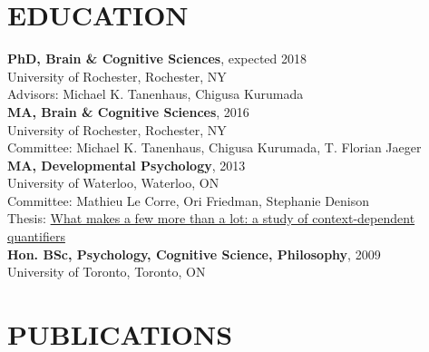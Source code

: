 \documentclass[margin, 7pt]{res} %
\begin{document}
\begin{resume} 


\section{EDUCATION}

{\bf PhD, Brain \& Cognitive Sciences}, expected 2018 \\
University of Rochester, Rochester, NY \\
Advisors: Michael K. Tanenhaus, Chigusa Kurumada \medskip \\
{\bf MA, Brain \& Cognitive Sciences}, 2016 \\
University of Rochester, Rochester, NY \\
Committee: Michael K. Tanenhaus, Chigusa Kurumada, T. Florian Jaeger \medskip \\
{\bf MA, Developmental Psychology}, 2013 \\
University of Waterloo, Waterloo, ON \\
Committee: Mathieu Le Corre, Ori Friedman, Stephanie Denison  \\
Thesis: \href{https://uwspace.uwaterloo.ca/handle/10012/7822}{What makes a few more than a lot: a study of context-dependent quantifiers} \medskip \\
{\bf Hon. BSc, Psychology, Cognitive Science, Philosophy}, 2009 \\
University of Toronto, Toronto, ON \\

 
 
 \section{PUBLICATIONS}


\end{resume}
\end{document}
